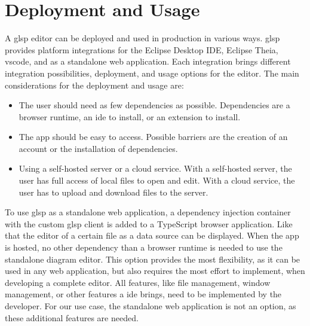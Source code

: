 \section{Deployment and Usage}
\label{sec:deployment}

A \ac{glsp} editor can be deployed and used in production in various ways. \ac{glsp} provides platform integrations for the Eclipse Desktop IDE, Eclipse Theia, \ac{vscode}, and as a standalone web application. Each integration brings different integration possibilities, deployment, and usage options for the editor. \cite{glsp-doc} The main considerations for the deployment and usage are:
  \begin{itemize}
    \item The user should need as few dependencies as possible. Dependencies are a browser runtime, an \acs{ide} to install, or an extension to install.
    \item The app should be easy to access. Possible barriers are the creation of an account or the installation of dependencies.
    \item Using a self-hosted server or a cloud service. With a self-hosted server, the user has full access of local files to open and edit. With a cloud service, the user has to upload and download files to the server.
  \end{itemize}
  
  To use \ac{glsp} as a standalone web application, a dependency injection container with the custom \ac{glsp} client is added to a TypeScript browser application. Like that the editor of a certain file as a data source can be displayed. When the app is hosted, no other dependency than a browser runtime is needed to use the standalone diagram editor. \cite{glsp-client-repo} This option provides the most flexibility, as it can be used in any web application, but also requires the most effort to implement, when developing a complete editor. All features, like file management, window management, or other features a \acs{ide} brings, need to be implemented by the developer. \cite{glsp-client-repo} For our use case, the standalone web application is not an option, as these additional features are needed. 

